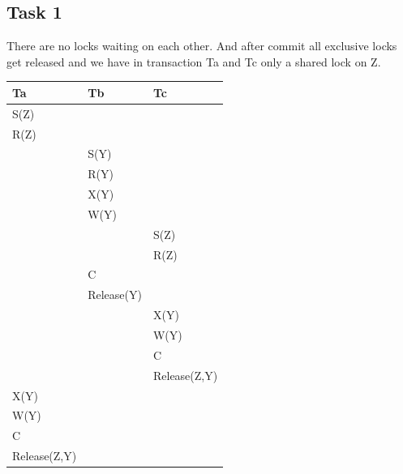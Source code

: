 \documentclass[12pt,a4paper]{article}
\begin{document}
\subsection{Task 1}
There are no locks waiting on each other. And after commit all exclusive locks get released and we have in transaction Ta and Tc only a shared lock on Z.
\begin{table}[!htbp]
    \centering
    \begin{tabularx}{\textwidth}{l|l|l}
        \hline
        Ta & Tb & Tc \\ 
        \hline
        S(Z) &  &  \\
        R(Z) &  &  \\
             & S(Y) & \\
             & R(Y) & \\
             & X(Y) & \\             
             & W(Y) & \\
             &  & S(Z)\\             
        	 &  & R(Z)\\
       		& C & \\        	 
       		& Release(Y) & \\
        	& & X(Y) \\       		
        	& & W(Y) \\
        	& & C \\ 
			& & Release(Z,Y) \\
		X(Y) & &  \\  
        W(Y) & &  \\   
        C & &  \\   
        Release(Z,Y) & &  \\ 
        \hline
    \end{tabularx}
\end{table}
\newpage
\end{document}
